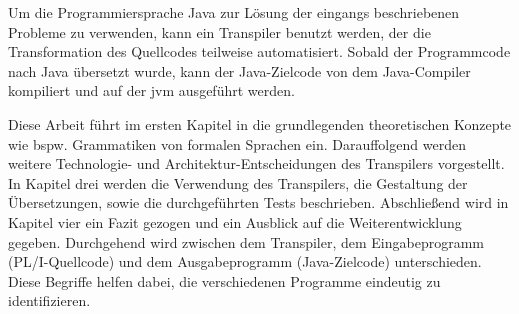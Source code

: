 Um die Programmiersprache Java zur Lösung der eingangs beschriebenen Probleme zu verwenden, kann ein Transpiler benutzt werden, der die Transformation des Quellcodes teilweise automatisiert.
Sobald der Programmcode nach Java übersetzt wurde, kann der Java-Zielcode von dem Java-Compiler kompiliert und auf der \ac{jvm} ausgeführt werden.

Diese Arbeit führt im ersten Kapitel in die grundlegenden theoretischen Konzepte wie bspw. Grammatiken von formalen Sprachen ein. Darauffolgend werden weitere Technologie- und Architektur-Entscheidungen des Transpilers vorgestellt. In Kapitel drei werden die Verwendung des Transpilers, die Gestaltung der Übersetzungen, sowie die durchgeführten Tests beschrieben. Abschließend wird in Kapitel vier ein Fazit gezogen und ein Ausblick auf die Weiterentwicklung gegeben.
Durchgehend wird zwischen dem Transpiler, dem Eingabeprogramm (PL/I-Quellcode) und dem Ausgabeprogramm (Java-Zielcode) unterschieden. Diese Begriffe helfen dabei, die verschiedenen Programme eindeutig zu identifizieren. 


     




% 	 
%	 
%
 \pagebreak
